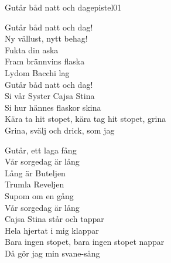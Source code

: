 \begin{song}{Gutår båd natt och dag}{epistel01}
\begin{vers}
Gutår båd natt och dag!\\
Ny vällust, nytt behag!\\
Fukta din aska\\
Fram brännvins flaska\\
Lydom Bacchi lag\\
Gutår båd natt och dag!\\
Si vår Syster Cajsa Stina\\
Si hur hännes flaskor skina\\
Kära ta hit stopet, kära tag hit stopet, grina\\
Grina, svälj och drick, som jag\\
\end{vers}
\begin{vers}
Gutår, ett laga fång\\
Vår sorgedag är lång\\
Lång är Buteljen\\
Trumla Reveljen\\
Supom om en gång\\
Vår sorgedag är lång\\
Cajsa Stina står och tappar\\
Hela hjertat i mig klappar\\
Bara ingen stopet, bara ingen stopet nappar\\
Då gör jag min svane-sång\\
\end{vers}
\end{song}
